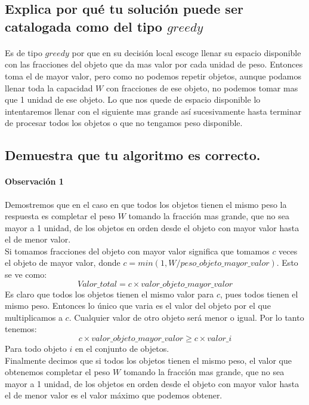 \documentclass[12pt]{article}
\begin{document}
 \subsection{Explica por qué tu solución puede ser catalogada como del tipo $greedy$}
 \paragraph{} Es de tipo $greedy$ por que en su decisión local escoge llenar su espacio disponible con las fracciones del objeto que da mas valor por cada unidad de peso. Entonces toma el de mayor valor, pero como no podemos repetir objetos, aunque podamos llenar toda la capacidad $W$ con fracciones de ese objeto, no podemos tomar mas que 1 unidad de ese objeto. Lo que nos quede de espacio disponible lo intentaremos llenar con el siguiente mas grande así sucesivamente hasta terminar de procesar todos los objetos o que no tengamos peso disponible. 
 \subsection{Demuestra que tu algoritmo es correcto.}
 \paragraph{Observación 1} Demostremos que en el caso en que todos los objetos tienen el mismo peso la respuesta es completar el peso $W$ tomando la fracción mas grande, que no sea mayor a 1 unidad, de los objetos en orden desde el objeto con mayor valor hasta el de menor valor.\\
 Si tomamos fracciones del objeto con mayor valor significa que tomamos $c$ veces el objeto de mayor valor, donde $c= min(1,W/peso\_objeto\_mayor\_valor)$. Esto se ve como:\\
  \begin{equation}
Valor\_total = c \times valor\_objeto\_mayor\_valor
  \end{equation}
 Es claro que todos los objetos tienen el mismo valor para $c$, pues todos tienen el mismo peso. Entonces lo único que varia es el valor del objeto por el que multiplicamos a $c$. Cualquier valor de otro objeto será menor o igual. Por lo tanto tenemos:
   \begin{equation}
 c \times valor\_objeto\_mayor\_valor \geq c \times valor\_i
 \end{equation}
 Para todo objeto $i$ en el conjunto de objetos.\\
 Finalmente decimos que si todos los objetos tienen el mismo peso, el valor que obtenemos completar el peso $W$ tomando la fracción mas grande, que no sea mayor a 1 unidad, de los objetos en orden desde el objeto con mayor valor hasta el de menor valor es el valor máximo que podemos obtener.
\end{document}
